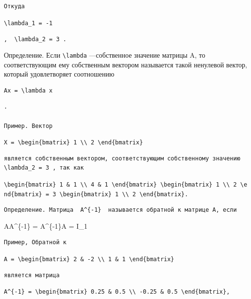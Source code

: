 \documentclass[
  ukrainian,
]{article}
\begin{document}
\begin{verbatim}
Откуда
\end{verbatim}

\texttt{\textbackslash{}lambda\_1\ =\ -1}

\texttt{,\ \ \textquotesingle{}\textbackslash{}lambda\_2\ =\ 3\textquotesingle{}\ .}

Определение. Если \texttt{\textbackslash{}lambda} ---собственное
значение матрицы A, то соответствующим ему собственным вектором
называется такой ненулевой вектор, который удовлетворяет соотношению

\begin{verbatim}
Ax = \lambda x
\end{verbatim}

\begin{verbatim}
.

Пример. Вектор
\end{verbatim}

\texttt{X\ =\ \textbackslash{}begin\{bmatrix\}\ 1\ \textbackslash{}\textbackslash{}\ 2\ \textbackslash{}end\{bmatrix\}}

\begin{verbatim}
является собственным вектором, соответствующим собственному значению  \lambda_2 = 3 , так как
\end{verbatim}

\texttt{\textbackslash{}begin\{bmatrix\}\ 1\ \&\ 1\ \textbackslash{}\textbackslash{}\ 4\ \&\ 1\ \textbackslash{}end\{bmatrix\}\ \textbackslash{}begin\{bmatrix\}\ 1\ \textbackslash{}\textbackslash{}\ 2\ \textbackslash{}end\{bmatrix\}\ =\ 3\ \textbackslash{}begin\{bmatrix\}\ 1\ \textbackslash{}\textbackslash{}\ 2\ \textbackslash{}end\{bmatrix\}.}

\begin{verbatim}
Определение. Матрица  A^{-1}  называется обратной к матрице A, если
\end{verbatim}

AA\^{}\{-1\} = A\^{}\{-1\}A = I\_1

\begin{verbatim}
Пример, Обратной к
\end{verbatim}

\texttt{A\ =\ \textbackslash{}begin\{bmatrix\}\ 2\ \&\ -2\ \textbackslash{}\textbackslash{}\ 1\ \&\ 1\ \textbackslash{}end\{bmatrix\}}

\begin{verbatim}
является матрица
\end{verbatim}

\texttt{A\^{}\{-1\}\ =\ \textbackslash{}begin\{bmatrix\}\ 0.25\ \&\ 0.5\ \textbackslash{}\textbackslash{}\ -0.25\ \&\ 0.5\ \textbackslash{}end\{bmatrix\},}
\end{document}
